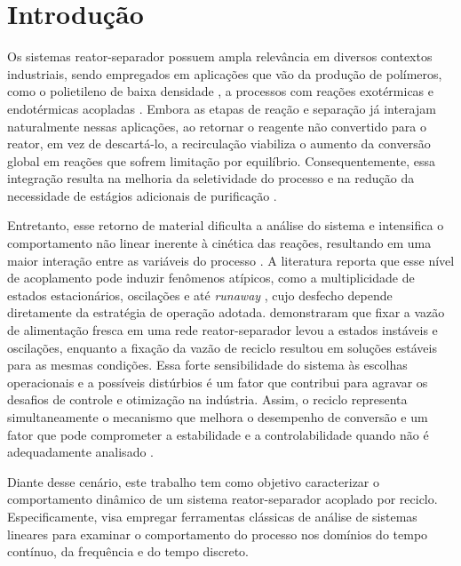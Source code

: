 \section{Introdução}

Os sistemas reator-separador possuem ampla relevância em diversos contextos industriais, sendo empregados em aplicações que vão da produção de polímeros, como o polietileno de baixa densidade \cite{hafele_2005}, a processos com reações exotérmicas e endotérmicas acopladas \cite{altimari_2008}.
Embora as etapas de reação e separação já interajam naturalmente nessas aplicações, ao retornar o reagente não convertido para o reator, em vez de descartá-lo, a recirculação viabiliza o aumento da conversão global em reações que sofrem limitação por equilíbrio.
Consequentemente, essa integração resulta na melhoria da seletividade do processo e na redução da necessidade de estágios adicionais de purificação \cite{sainio_2020}.

Entretanto, esse retorno de material dificulta a análise do sistema e intensifica o comportamento não linear inerente à cinética das reações, resultando em uma maior interação entre as variáveis do processo \cite{zeyer_2004, sainio_2020}.
A literatura reporta que esse nível de acoplamento pode induzir fenômenos atípicos, como a multiplicidade de estados estacionários, oscilações e até \textit{runaway} \cite{sainio_2020, bildea_2000, altimari_2008}, cujo desfecho depende diretamente da estratégia de operação adotada.
\textcite{pushpavanam_2001} demonstraram que fixar a vazão de alimentação fresca em uma rede reator-separador levou a estados instáveis e oscilações, enquanto a fixação da vazão de reciclo resultou em soluções estáveis para as mesmas condições.
Essa forte sensibilidade do sistema às escolhas operacionais e a possíveis distúrbios é um fator que contribui para agravar os desafios de controle e otimização na indústria.
Assim, o reciclo representa simultaneamente o mecanismo que melhora o desempenho de conversão e um fator que pode comprometer a estabilidade e a controlabilidade quando não é adequadamente analisado \cite{sainio_2020, zeyer_2004}.

Diante desse cenário, este trabalho tem como objetivo caracterizar o comportamento dinâmico de um sistema reator-separador acoplado por reciclo.
Especificamente, visa empregar ferramentas clássicas de análise de sistemas lineares para examinar o comportamento do processo nos domínios do tempo contínuo, da frequência e do tempo discreto.


